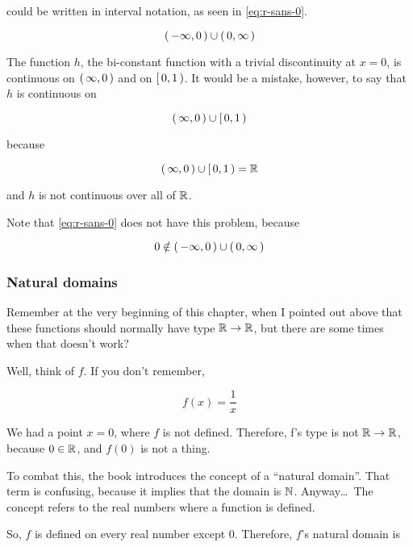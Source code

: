  could be written in interval notation, as seen in
\cref{eq:r-sans-0}.

\begin{equation}
  \label{eq:r-sans-0}
  \left(\, -\infty, 0 \,\right) \cup \left(\, 0, \infty \,\right)
\end{equation}

The function $h$, the bi-constant function with a trivial discontinuity at
$x = 0$, is continuous on $\left(\, \infty,0 \,\right)$ and on $\left[\, 0, 1 \,\right)$. It would be
a mistake, however, to say that $h$ is continuous on

\begin{equation}
  \left(\, \infty, 0 \,\right) \cup \left[\, 0, 1 \,\right)
\end{equation}

because 

\begin{equation}
  \left(\, \infty, 0 \,\right) \cup \left[\, 0, 1 \,\right) = \mathbb{R}
\end{equation}

and $h$ is not continuous over all of $\mathbb{R}$.

Note that \cref{eq:r-sans-0} does not have this problem, because

\begin{equation}
  0 \notin \left(\, -\infty, 0 \,\right) \cup \left(\, 0, \infty \,\right)
\end{equation}

\subsubsection{Natural domains}

Remember at the very beginning of this chapter, when I pointed out above that
these functions should normally have type $\mathbb{R} \to \mathbb{R}$, but there are some times
when that doesn't work?

Well, think of $f$. If you don't remember,

\begin{equation}
  f(x) = \frac{1}{x}
\end{equation}

We had a point $x = 0$, where $f$ is not defined. Therefore, f's type is not $\mathbb{R}
\to \mathbb{R}$, because $0 \in \mathbb{R}$, and $f(0)$ is not a thing.

To combat this, the book introduces the concept of a ``natural domain''. That
term is confusing, because it implies that the domain is $\mathbb{N}$. Anyway\dots\ The
concept refers to the real numbers where a function is defined.

So, $f$ is defined on every real number except $0$. Therefore, $f$'s natural
domain is

